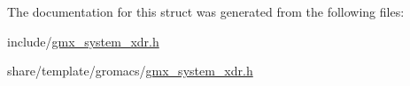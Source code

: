\-The documentation for this struct was generated from the following files\-:\begin{DoxyCompactItemize}
\item 
include/\hyperlink{include_2gmx__system__xdr_8h}{gmx\-\_\-system\-\_\-xdr.\-h}\item 
share/template/gromacs/\hyperlink{share_2template_2gromacs_2gmx__system__xdr_8h}{gmx\-\_\-system\-\_\-xdr.\-h}\end{DoxyCompactItemize}
